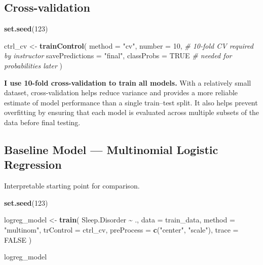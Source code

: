\documentclass[
]{article}
\newenvironment{Shaded}{\begin{snugshade}}{\end{snugshade}}
\newcommand{\AttributeTok}[1]{\textcolor[rgb]{0.13,0.29,0.53}{#1}}
\newcommand{\CommentTok}[1]{\textcolor[rgb]{0.56,0.35,0.01}{\textit{#1}}}
\newcommand{\ConstantTok}[1]{\textcolor[rgb]{0.56,0.35,0.01}{#1}}
\newcommand{\DecValTok}[1]{\textcolor[rgb]{0.00,0.00,0.81}{#1}}
\newcommand{\FunctionTok}[1]{\textcolor[rgb]{0.13,0.29,0.53}{\textbf{#1}}}
\newcommand{\NormalTok}[1]{#1}
\newcommand{\OtherTok}[1]{\textcolor[rgb]{0.56,0.35,0.01}{#1}}
\newcommand{\SpecialCharTok}[1]{\textcolor[rgb]{0.81,0.36,0.00}{\textbf{#1}}}
\newcommand{\StringTok}[1]{\textcolor[rgb]{0.31,0.60,0.02}{#1}}
\begin{document}
\subsection{Cross-validation}\label{cross-validation}

\begin{Shaded}
\begin{Highlighting}[]
\FunctionTok{set.seed}\NormalTok{(}\DecValTok{123}\NormalTok{)}

\NormalTok{ctrl\_cv }\OtherTok{\textless{}{-}} \FunctionTok{trainControl}\NormalTok{(}
  \AttributeTok{method =} \StringTok{"cv"}\NormalTok{,}
  \AttributeTok{number =} \DecValTok{10}\NormalTok{,                  }\CommentTok{\# 10{-}fold CV required by instructor}
  \AttributeTok{savePredictions =} \StringTok{"final"}\NormalTok{,}
  \AttributeTok{classProbs =} \ConstantTok{TRUE}             \CommentTok{\# needed for probabilities later}
\NormalTok{)}
\end{Highlighting}
\end{Shaded}

\textbf{I use 10-fold cross-validation to train all models.} With a
relatively small dataset, cross-validation helps reduce variance and
provides a more reliable estimate of model performance than a single
train--test split. It also helps prevent overfitting by ensuring that
each model is evaluated across multiple subsets of the data before final
testing.

\subsection{Baseline Model --- Multinomial Logistic
Regression}\label{baseline-model-multinomial-logistic-regression}

Interpretable starting point for comparison.

\begin{Shaded}
\begin{Highlighting}[]
\FunctionTok{set.seed}\NormalTok{(}\DecValTok{123}\NormalTok{)}

\NormalTok{logreg\_model }\OtherTok{\textless{}{-}} \FunctionTok{train}\NormalTok{(}
\NormalTok{  Sleep.Disorder }\SpecialCharTok{\textasciitilde{}}\NormalTok{ .,}
  \AttributeTok{data       =}\NormalTok{ train\_data,}
  \AttributeTok{method     =} \StringTok{"multinom"}\NormalTok{,}
  \AttributeTok{trControl  =}\NormalTok{ ctrl\_cv,}
  \AttributeTok{preProcess =} \FunctionTok{c}\NormalTok{(}\StringTok{"center"}\NormalTok{, }\StringTok{"scale"}\NormalTok{),}
  \AttributeTok{trace      =} \ConstantTok{FALSE}
\NormalTok{)}

\NormalTok{logreg\_model}
\end{Highlighting}
\end{Shaded}
\end{document}
